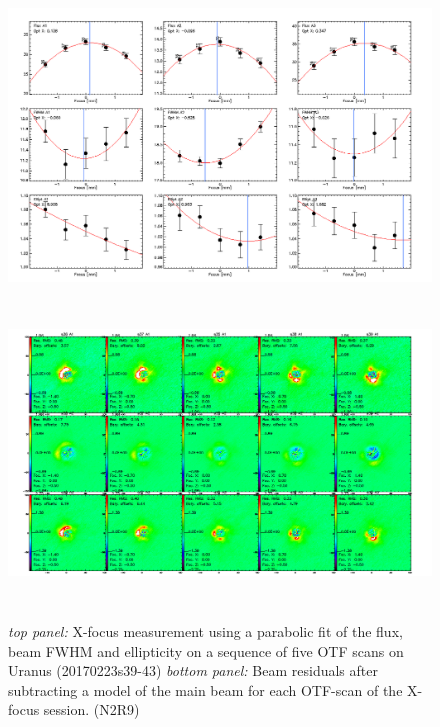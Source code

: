 \begin{figure}[h!]
\centering
\includegraphics[height=8cm]{Figures/plot_20170223s39.png}
\hspace{0.5cm}
\includegraphics[height=8cm]{Figures/residuals_focus_otf_20170223s39.png}
\caption[Lateral X focus measurements]{\emph{top panel: }X-focus measurement using a
    parabolic fit of the flux, beam FWHM and ellipticity on a sequence
    of five OTF scans on Uranus (20170223s39-43) \emph{bottom panel: }Beam residuals
    after subtracting a model of the main beam for each OTF-scan of the X-focus
    session. (N2R9)}
\label{fig:X_focus}
\end{figure}

